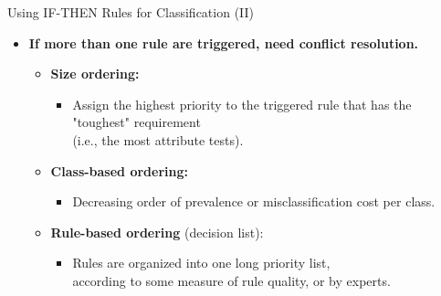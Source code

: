 \begin{frame}{Using \uppercase{if-then} Rules for Classification (II)}
	\begin{itemize}
		\item \textbf{If more than one rule are triggered, need {\color{airforceblue}conflict resolution}.}
		      \begin{itemize}
			      \item \textbf{\color{airforceblue}Size ordering:}
			            \begin{itemize}
				            \item Assign the highest priority to the triggered rule that has the "toughest" requirement \\ (i.e., the most attribute tests).
			            \end{itemize}
			      \item \textbf{\color{airforceblue}Class-based ordering:}
			            \begin{itemize}
				            \item Decreasing order of prevalence or misclassification cost per class.
			            \end{itemize}
			      \item \textbf{\color{airforceblue}Rule-based ordering} (decision list):
			            \begin{itemize}
				            \item Rules are organized into one long priority list,\\
				                  according to some measure of rule quality, or by experts.
			            \end{itemize}
		      \end{itemize}
	\end{itemize}
\end{frame}

